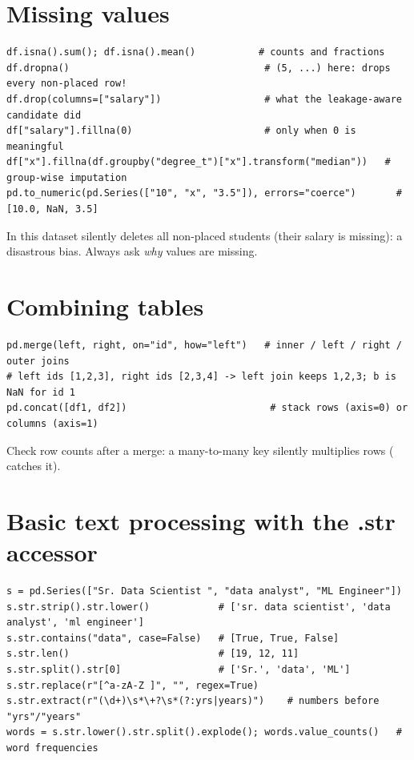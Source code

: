 \section{Missing values}
\begin{lstlisting}
df.isna().sum(); df.isna().mean()           # counts and fractions
df.dropna()                                  # (5, ...) here: drops every non-placed row!
df.drop(columns=["salary"])                  # what the leakage-aware candidate did
df["salary"].fillna(0)                       # only when 0 is meaningful
df["x"].fillna(df.groupby("degree_t")["x"].transform("median"))   # group-wise imputation
pd.to_numeric(pd.Series(["10", "x", "3.5"]), errors="coerce")       # [10.0, NaN, 3.5]
\end{lstlisting}
In this dataset  silently deletes all non-placed students (their salary is missing): a disastrous bias. Always ask \emph{why} values are missing.

\section{Combining tables}
\begin{lstlisting}
pd.merge(left, right, on="id", how="left")   # inner / left / right / outer joins
# left ids [1,2,3], right ids [2,3,4] -> left join keeps 1,2,3; b is NaN for id 1
pd.concat([df1, df2])                         # stack rows (axis=0) or columns (axis=1)
\end{lstlisting}
Check row counts after a merge: a many-to-many key silently multiplies rows ( catches it).

\section{Basic text processing with the .str accessor}
\begin{lstlisting}
s = pd.Series(["Sr. Data Scientist ", "data analyst", "ML Engineer"])
s.str.strip().str.lower()            # ['sr. data scientist', 'data analyst', 'ml engineer']
s.str.contains("data", case=False)   # [True, True, False]
s.str.len()                          # [19, 12, 11]
s.str.split().str[0]                 # ['Sr.', 'data', 'ML']
s.str.replace(r"[^a-zA-Z ]", "", regex=True)
s.str.extract(r"(\d+)\s*\+?\s*(?:yrs|years)")    # numbers before "yrs"/"years"
words = s.str.lower().str.split().explode(); words.value_counts()   # word frequencies
\end{lstlisting}

